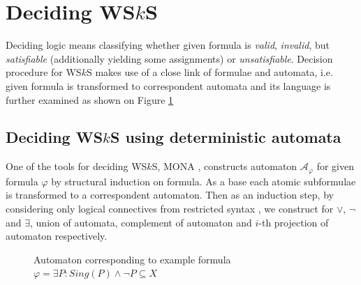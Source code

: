 \documentclass{eeict}
\begin{document}
\section{Deciding WS$k$S}

Deciding logic means classifying whether given formula is \emph{valid},
\emph{invalid}, but \emph{satisfiable} (additionally yielding some assignments)
or \emph{unsatisfiable}. Decision procedure for WS$k$S makes use of a close link
of formulae and automata, i.e. given formula is transformed to correspondent automata and its language is
further examined as shown on Figure \ref{example}

\subsection{Deciding WS$k$S using deterministic automata}

One of the tools for deciding WS$k$S, MONA \cite{mona}, constructs automaton
$\mathcal{A}_\varphi$ for given formula $\varphi$	by structural induction on
formula.
As a base each atomic subformulae is transformed to a correspondent automaton.
Then as an induction step, by considering only logical connectives from
restricted syntax \cite{tata}, we construct for $\vee$, $\neg$ and $\exists$,
union of automata, complement of automaton and $i$-th projection of automaton respectively.

\begin{figure}
 \begin{center}
 \end{center}
 \caption{Automaton corresponding to example formula $\varphi = \exists P:
 Sing(P) \wedge\neg P \subseteq X$}\label{example}
\end{figure}
\end{document}
